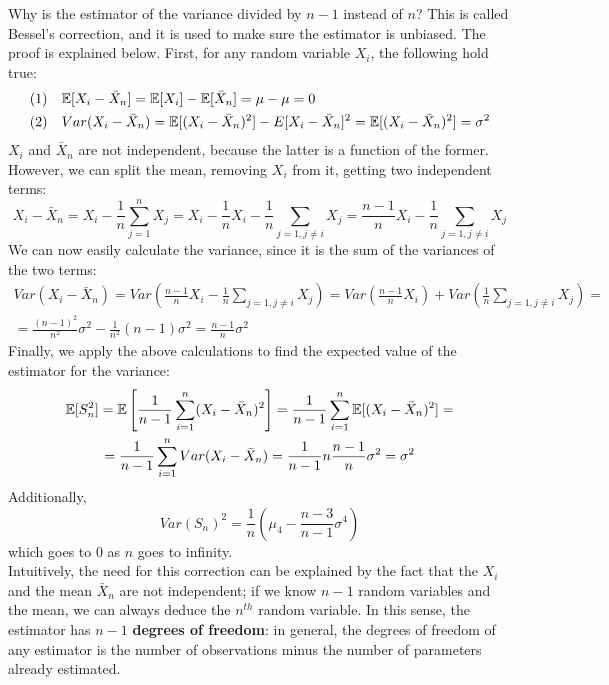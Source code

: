Why is the estimator of the variance divided by $n-1$ instead of $n$? This is called Bessel's correction, and it is used to make sure the estimator is unbiased. The proof is explained below. First, for any random variable $X_i$, the following hold true:
\begin{align*}
    &(1)\quad \mathbb{E}[X_i - \bar{X}_n] = \mathbb{E}[X_i] - \mathbb{E}[\bar{X}_n] = \mu - \mu = 0 \\
    &(2)\quad Var(X_i - \bar{X}_n) = \mathbb{E}[(X_i - \bar{X}_n)^2] - E[X_i - \bar{X}_n]^2 = \mathbb{E}[(X_i - \bar{X}_n)^2] = \sigma^2
\end{align*}
$X_i$ and $\bar{X}_n$ are not independent, because the latter is a function of the former. However, we can split the mean, removing $X_i$ from it, getting two independent terms:
\[
    X_i - \bar{X}_n = X_i - \frac{1}{n} \sum_{j=1}^n X_j = X_i - \frac{1}{n} X_i - \frac{1}{n} \sum_{j=1, j \not = i} X_j = \frac{n - 1}{n} X_i - \frac{1}{n} \sum_{j=1, j \not = i} X_j
\]
We can now easily calculate the variance, since it is the sum of the variances of the two terms:
\begin{gather*}
    Var(X_i - \bar{X}_n) = Var\left(\frac{n - 1}{n} X_i - \frac{1}{n} \sum_{j=1, j \not = i} X_j\right) = Var\left(\frac{n - 1}{n} X_i\right) + Var\left(\frac{1}{n} \sum_{j=1, j \not = i} X_j\right) =\\
    = \frac{(n - 1)^2}{n^2} \sigma^2 - \frac{1}{n^2} (n-1) \sigma^2 = \frac{n-1}{n} \sigma^2
\end{gather*}
Finally, we apply the above calculations to find the expected value of the estimator for the variance:
\begin{gather*}
    \mathbb{E}[S_n^2] = \mathbb{E}\left[\frac{1}{n-1} \sum_{i=1}^n (X_i - \bar{X}_n)^2\right] = \frac{1}{n-1} \sum_{i=1}^n \mathbb{E}[(X_i - \bar{X}_n)^2] =\\
    = \frac{1}{n-1} \sum_{i=1}^n Var(X_i - \bar{X}_n) = \frac{1}{n-1} n \frac{n-1}{n} \sigma^2 = \sigma^2
\end{gather*}
Additionally,
\[
    Var(S_n)^2 = \frac{1}{n}(\mu_4 - \frac{n-3}{n-1}\sigma^4)
\]
which goes to 0 as $n$ goes to infinity.\\
Intuitively, the need for this correction can be explained by the fact that the $X_i$ and the mean $\bar{X}_n$ are not independent; if we know $n-1$ random variables and the mean, we can always deduce the $n^{th}$ random variable. In this sense, the estimator has $n-1$ \textbf{degrees of freedom}: in general, the degrees of freedom of any estimator is the number of observations minus the number of parameters already estimated.


